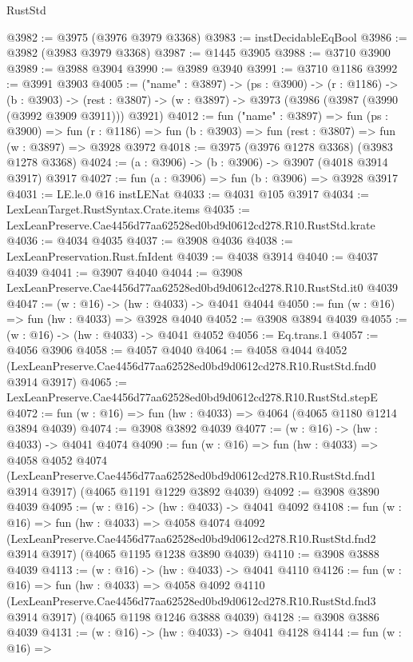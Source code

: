\begin{lexlean}{RustStd}
\begin{coremodule}
@3982 := @3975 (@3976 @3979 @3368)
@3983 := instDecidableEqBool
@3986 := @3982 (@3983 @3979 @3368)
@3987 := @1445 @3905
@3988 := @3710 @3900
@3989 := @3988 @3904
@3990 := @3989 @3940
@3991 := @3710 @1186
@3992 := @3991 @3903
@4005 := ("name" : @3897) ->
  (ps : @3900) ->
  (r : @1186) ->
  (b : @3903) ->
  (rest : @3807) -> (w : @3897) -> @3973 (@3986 (@3987 (@3990 (@3992 @3909 @3911))) @3921)
@4012 := fun ("name" : @3897) =>
  fun (ps : @3900) =>
  fun (r : @1186) => fun (b : @3903) => fun (rest : @3807) => fun (w : @3897) => @3928 @3972
@4018 := @3975 (@3976 @1278 @3368) (@3983 @1278 @3368)
@4024 := (a : @3906) -> (b : @3906) -> @3907 (@4018 @3914 @3917) @3917
@4027 := fun (a : @3906) => fun (b : @3906) => @3928 @3917
@4031 := LE.le.{0} @16 instLENat
@4033 := @4031 @105 @3917
@4034 := LexLeanTarget.RustSyntax.Crate.items
@4035 := LexLeanPreserve.Cae4456d77aa62528ed0bd9d0612cd278.R10.RustStd.krate
@4036 := @4034 @4035
@4037 := @3908 @4036
@4038 := LexLeanPreservation.Rust.fnIdent
@4039 := @4038 @3914
@4040 := @4037 @4039
@4041 := @3907 @4040
@4044 := @3908 LexLeanPreserve.Cae4456d77aa62528ed0bd9d0612cd278.R10.RustStd.it0 @4039
@4047 := (w : @16) -> (hw : @4033) -> @4041 @4044
@4050 := fun (w : @16) => fun (hw : @4033) => @3928 @4040
@4052 := @3908 @3894 @4039
@4055 := (w : @16) -> (hw : @4033) -> @4041 @4052
@4056 := Eq.trans.{1}
@4057 := @4056 @3906
@4058 := @4057 @4040
@4064 := @4058
    @4044
    @4052
    (LexLeanPreserve.Cae4456d77aa62528ed0bd9d0612cd278.R10.RustStd.fnd0 @3914 @3917)
@4065 := LexLeanPreserve.Cae4456d77aa62528ed0bd9d0612cd278.R10.RustStd.stepE
@4072 := fun (w : @16) => fun (hw : @4033) => @4064 (@4065 @1180 @1214 @3894 @4039)
@4074 := @3908 @3892 @4039
@4077 := (w : @16) -> (hw : @4033) -> @4041 @4074
@4090 := fun (w : @16) =>
  fun (hw : @4033) =>
  @4058
    @4052
    @4074
    (LexLeanPreserve.Cae4456d77aa62528ed0bd9d0612cd278.R10.RustStd.fnd1 @3914 @3917)
    (@4065 @1191 @1229 @3892 @4039)
@4092 := @3908 @3890 @4039
@4095 := (w : @16) -> (hw : @4033) -> @4041 @4092
@4108 := fun (w : @16) =>
  fun (hw : @4033) =>
  @4058
    @4074
    @4092
    (LexLeanPreserve.Cae4456d77aa62528ed0bd9d0612cd278.R10.RustStd.fnd2 @3914 @3917)
    (@4065 @1195 @1238 @3890 @4039)
@4110 := @3908 @3888 @4039
@4113 := (w : @16) -> (hw : @4033) -> @4041 @4110
@4126 := fun (w : @16) =>
  fun (hw : @4033) =>
  @4058
    @4092
    @4110
    (LexLeanPreserve.Cae4456d77aa62528ed0bd9d0612cd278.R10.RustStd.fnd3 @3914 @3917)
    (@4065 @1198 @1246 @3888 @4039)
@4128 := @3908 @3886 @4039
@4131 := (w : @16) -> (hw : @4033) -> @4041 @4128
@4144 := fun (w : @16) =>

\end{coremodule}
\end{lexlean}

